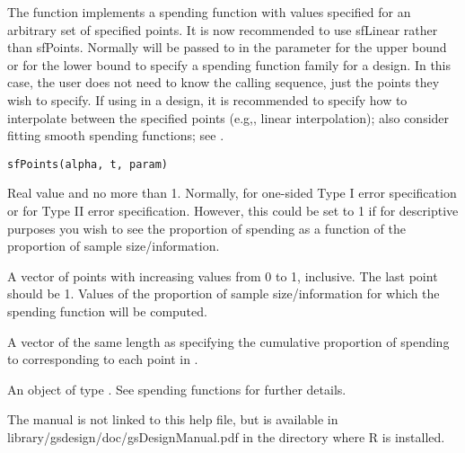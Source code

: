 \begin{Description}\relax
The function  implements a spending function with values specified for an arbitrary set of specified points.
It is now recommended to use sfLinear rather than sfPoints.
Normally  will be passed to  in the parameter  for the upper bound or
 for the lower bound to specify a spending function family for a design.
In this case, the user does not need to know the calling sequence, just the points they wish to specify.
If using  in a design, it is recommended to specify how to interpolate between the specified points (e.g,, linear interpolation); also consider fitting smooth spending functions; see 
.
\end{Description}
\begin{Usage}
\begin{verbatim}
sfPoints(alpha, t, param)
\end{verbatim}
\end{Usage}
\begin{Arguments}
\begin{ldescription}
\item[\code{alpha}] Real value  and no more than 1. Normally,  for one-sided Type I error specification
or  for Type II error specification. However, this could be set to 1 if for descriptive purposes
you wish to see the proportion of spending as a function of the proportion of sample size/information.
\item[\code{t}] A vector of points with increasing values from 0 to 1, inclusive. The last point should be 1.
Values of the proportion of sample size/information for which the spending function will be computed.
\item[\code{param}] A vector of the same length as  specifying the cumulative proportion of spending
to corresponding to each point in .
\end{ldescription}
\end{Arguments}
\begin{Value}
An object of type . See spending functions for further details.
\end{Value}
\begin{Note}\relax
The manual is not linked to this help file, but is available in library/gsdesign/doc/gsDesignManual.pdf
in the directory where R is installed.
\end{Note}
